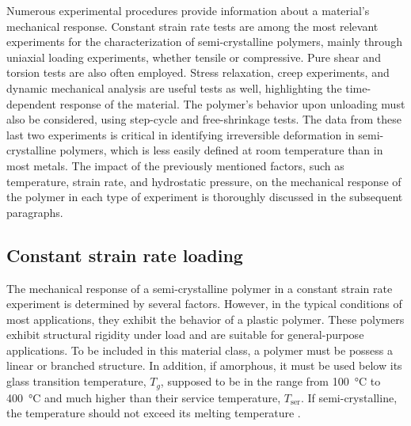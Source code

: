Numerous experimental procedures provide information about a material's mechanical response.
Constant strain rate tests are among the most relevant experiments for the characterization of semi-crystalline polymers, mainly through uniaxial loading experiments, whether tensile or compressive.
Pure shear and torsion tests are also often employed.
Stress relaxation, creep experiments, and dynamic mechanical analysis are useful tests as well, highlighting the time-dependent response of the material.
The polymer's behavior upon unloading must also be considered, using step-cycle and free-shrinkage tests.
The data from these last two experiments is critical in identifying irreversible deformation in semi-crystalline polymers, which is less easily defined at room temperature than in most metals.
The impact of the previously mentioned factors, such as temperature, strain rate, and hydrostatic pressure, on the mechanical response of the polymer in each type of experiment is thoroughly discussed in the subsequent paragraphs.

\subsection{Constant strain rate loading}

The mechanical response of a semi-crystalline polymer in a constant strain rate experiment is determined by several factors.
However, in the typical conditions of most applications, they exhibit the behavior of a plastic polymer.
These polymers exhibit structural rigidity under load and are suitable for general-purpose applications.
To be included in this material class, a polymer must be possess a linear or branched structure.
In addition, if amorphous, it must be used below its glass transition temperature, $T_g$, supposed to be in the range from \SI{100}{\celsius} to \SI{400}{\celsius} and much higher than their service temperature, $T_\mathrm{ser}$.
If semi-crystalline, the temperature should not exceed its melting temperature \citep{callister2014materials, arzhakovRelaxationPhysicalMechanical2019}.


